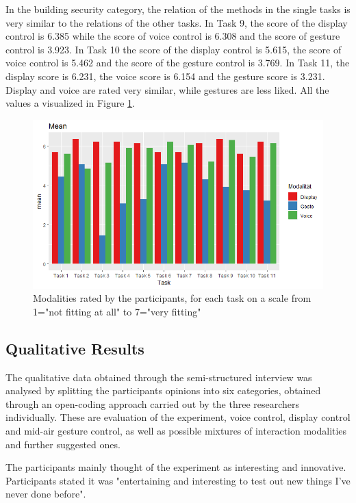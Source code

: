 \documentclass[sigchi]{acmart}
\begin{document}
	In the building security category, the relation of the methods in the single tasks is very similar to the relations of the other tasks. In Task 9, the score of the display control is 6.385 while the score of voice control is 6.308 and the score of gesture control is 3.923. In Task 10 the score of the display control is 5.615, the score of voice control is 5.462 and the score of the gesture control is 3.769. In Task 11, the display score is 6.231, the voice score is 6.154 and the gesture score is 3.231. Display and voice are rated very similar, while gestures are less liked.
	All the values a visualized in Figure \ref{figure:ModalityRating}.
	\begin{figure}			
		\centering
		\includegraphics[width=\columnwidth]{MeanGesamt}
		\caption{Modalities rated by the participants, for each task on a scale from 1="not fitting at all" to 7="very fitting"}
		\label{figure:ModalityRating}
	\end{figure}
	
	\subsection{Qualitative Results}
	The qualitative data obtained through the semi-structured interview was analysed by splitting the participants opinions into six categories, obtained through an open-coding approach carried out by the three researchers individually. These are evaluation of the experiment, voice control, display control and mid-air gesture control, as well as possible mixtures of interaction modalities and further suggested ones. 
	
	The participants mainly thought of the experiment as interesting and innovative. Participants stated it was "entertaining and interesting to test out new things I've never done before". 
	
\end{document}
